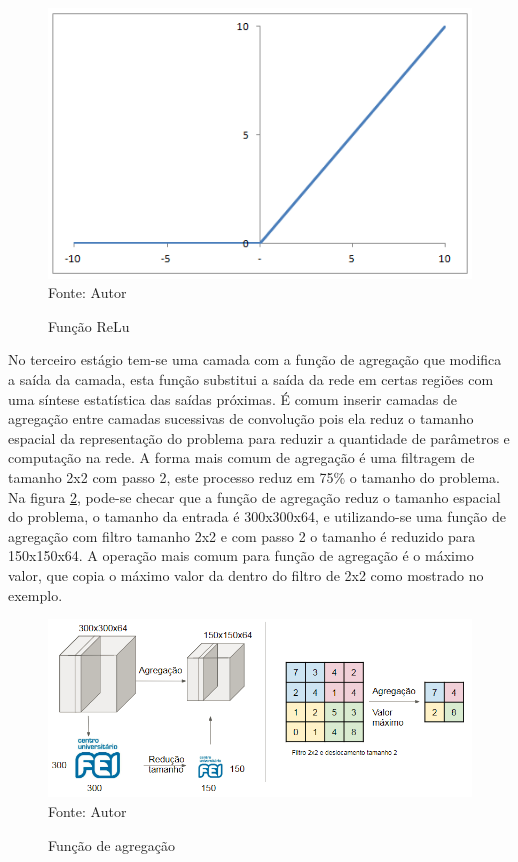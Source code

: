 \documentclass[
	12pt,				%
    oneside,			%
	a4paper,			%
	english,			%
	french,				%
	spanish,			%
	brazil,				%
	]{abntex2}
\begin{document}
\begin{figure}[H]
    \centering
    \caption{Função ReLu}
    \includegraphics[scale=0.75]{ReLu}\\
    Fonte: Autor\hfill
    \label{fig:relu}
\end{figure} 

No terceiro estágio tem-se uma camada com a função de agregação que modifica a saída da camada, esta função substitui a saída da rede em certas regiões com uma síntese estatística das saídas próximas. É comum inserir camadas de agregação entre camadas sucessivas de convolução pois ela reduz o tamanho espacial da representação do problema para reduzir a quantidade de parâmetros e computação na rede. A forma mais comum de agregação é uma filtragem de tamanho 2x2 com passo 2, este processo reduz em 75$\%$ o tamanho do problema. Na figura \ref{fig:pooling}, pode-se checar que a função de agregação reduz o tamanho espacial do problema, o tamanho da entrada é 300x300x64, e utilizando-se uma função de agregação com filtro tamanho 2x2 e com passo 2 o tamanho é reduzido para 150x150x64. A operação mais comum para função de agregação é o máximo valor, que copia o máximo valor da dentro do filtro de 2x2 como mostrado no exemplo.


\begin{figure}[H]
    \centering
    \caption{Função de agregação}
    \includegraphics[width=\textwidth]{pooling1}\\
    Fonte: Autor\hfill
    \label{fig:pooling}
\end{figure} 
\end{document}
